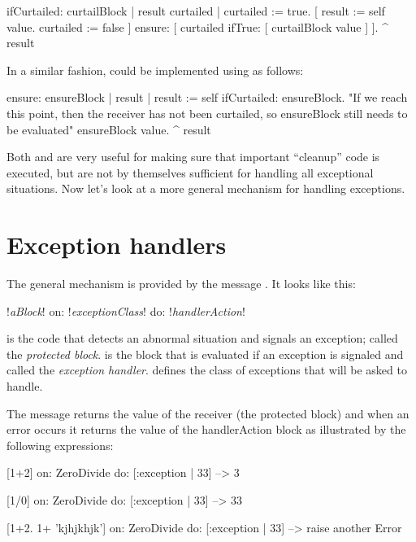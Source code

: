 \begin{code}{}
ifCurtailed: curtailBlock
	| result curtailed |
	curtailed := true.
	[	result := self value.
		curtailed := false ] ensure: [ curtailed ifTrue: [ curtailBlock value ] ].
	^ result
\end{code}

In a similar fashion,  could be implemented using  as follows:

\begin{code}{}
ensure: ensureBlock
	| result |
	result := self ifCurtailed: ensureBlock.
	"If we reach this point, then the receiver has not been curtailed,
	so ensureBlock still needs to be evaluated"
	ensureBlock value.
	^ result
\end{code}

Both  and  are very useful for making sure that important ``cleanup'' code is executed, but are not by themselves sufficient for handling all exceptional situations.
Now let's look at a more general mechanism for handling exceptions.

\section{Exception handlers}

The general mechanism is provided by the message . It looks like this:
\begin{code}{}
!\emph{aBlock}! on: !\emph{exceptionClass}! do: !\emph{handlerAction}!
\end{code}
\noindent
{} is the code that detects an abnormal situation and signals an exception; called the \emph{protected block}.   
 is the block that is evaluated if an exception is signaled and called the \emph{exception handler}.
 defines the class of exceptions that  will be asked to handle.


The message  returns the value of the receiver (the protected block) and when an error occurs it returns the value of the handlerAction block as illustrated by the following expressions:

\begin{code}{}
[1+2] on: ZeroDivide do: [:exception | 33] 
--> 3

[1/0] on: ZeroDivide do: [:exception | 33] 
--> 33

[1+2. 1+ 'kjhjkhjk'] on: ZeroDivide do: [:exception | 33] 
--> raise another Error 
\end{code}



